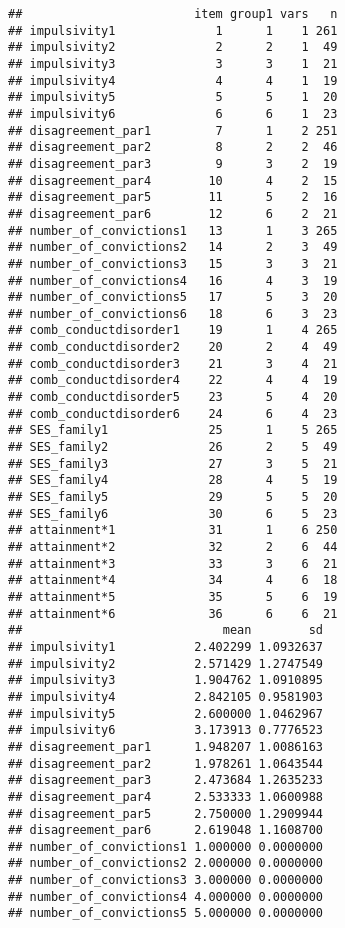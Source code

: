 \documentclass[]{tufte-handout}
\begin{document}
\begin{verbatim}
##                        item group1 vars   n
## impulsivity1              1      1    1 261
## impulsivity2              2      2    1  49
## impulsivity3              3      3    1  21
## impulsivity4              4      4    1  19
## impulsivity5              5      5    1  20
## impulsivity6              6      6    1  23
## disagreement_par1         7      1    2 251
## disagreement_par2         8      2    2  46
## disagreement_par3         9      3    2  19
## disagreement_par4        10      4    2  15
## disagreement_par5        11      5    2  16
## disagreement_par6        12      6    2  21
## number_of_convictions1   13      1    3 265
## number_of_convictions2   14      2    3  49
## number_of_convictions3   15      3    3  21
## number_of_convictions4   16      4    3  19
## number_of_convictions5   17      5    3  20
## number_of_convictions6   18      6    3  23
## comb_conductdisorder1    19      1    4 265
## comb_conductdisorder2    20      2    4  49
## comb_conductdisorder3    21      3    4  21
## comb_conductdisorder4    22      4    4  19
## comb_conductdisorder5    23      5    4  20
## comb_conductdisorder6    24      6    4  23
## SES_family1              25      1    5 265
## SES_family2              26      2    5  49
## SES_family3              27      3    5  21
## SES_family4              28      4    5  19
## SES_family5              29      5    5  20
## SES_family6              30      6    5  23
## attainment*1             31      1    6 250
## attainment*2             32      2    6  44
## attainment*3             33      3    6  21
## attainment*4             34      4    6  18
## attainment*5             35      5    6  19
## attainment*6             36      6    6  21
##                            mean        sd
## impulsivity1           2.402299 1.0932637
## impulsivity2           2.571429 1.2747549
## impulsivity3           1.904762 1.0910895
## impulsivity4           2.842105 0.9581903
## impulsivity5           2.600000 1.0462967
## impulsivity6           3.173913 0.7776523
## disagreement_par1      1.948207 1.0086163
## disagreement_par2      1.978261 1.0643544
## disagreement_par3      2.473684 1.2635233
## disagreement_par4      2.533333 1.0600988
## disagreement_par5      2.750000 1.2909944
## disagreement_par6      2.619048 1.1608700
## number_of_convictions1 1.000000 0.0000000
## number_of_convictions2 2.000000 0.0000000
## number_of_convictions3 3.000000 0.0000000
## number_of_convictions4 4.000000 0.0000000
## number_of_convictions5 5.000000 0.0000000

\end{verbatim}
\end{document}
